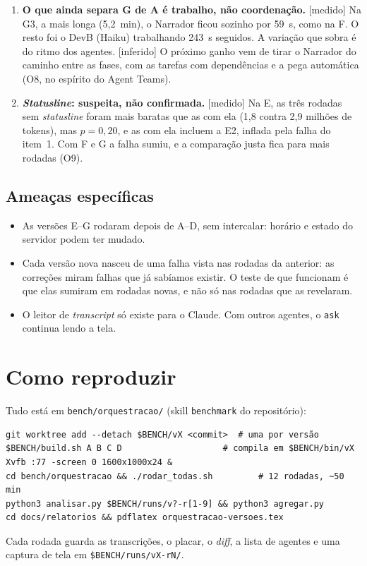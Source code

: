 \documentclass[11pt,a4paper]{article}
\newcommand{\rot}[1]{\textsf{\footnotesize[#1]}}
\begin{document}
\begin{enumerate}[leftmargin=*]
\item \textbf{O que ainda separa G de A é trabalho, não coordenação.} \rot{medido} Na G3, a mais longa (5,2~min), o
  Narrador ficou sozinho por 59~s, como na F. O resto foi o DevB (Haiku) trabalhando 243~s seguidos. A variação que
  sobra é do ritmo dos agentes. \rot{inferido} O próximo ganho vem de tirar o Narrador do caminho entre as fases, com
  as tarefas com dependências e a pega automática (O8, no espírito do Agent Teams).
\item \textbf{\emph{Statusline}: suspeita, não confirmada.} \rot{medido} Na E, as três rodadas sem \emph{statusline} foram
  mais baratas que as com ela (1,8 contra 2,9 milhões de tokens), mas $p=0{,}20$, e as com ela incluem a E2, inflada
  pela falha do item~1. Com F e G a falha sumiu, e a comparação justa fica para mais rodadas (O9).
\end{enumerate}

\subsection{Ameaças específicas}

\begin{itemize}
\item As versões E--G rodaram depois de A--D, sem intercalar: horário e estado do servidor podem ter mudado.
\item Cada versão nova nasceu de uma falha vista nas rodadas da anterior: as correções miram falhas que já sabíamos
  existir. O teste de que funcionam é que elas sumiram em rodadas novas, e não só nas rodadas que as revelaram.
\item O leitor de \emph{transcript} só existe para o Claude. Com outros agentes, o \texttt{ask} continua lendo a tela.
\end{itemize}

\section{Como reproduzir}

Tudo está em \texttt{bench/orquestracao/} (skill \texttt{benchmark} do repositório):
\begin{verbatim}
git worktree add --detach $BENCH/vX <commit>  # uma por versão
$BENCH/build.sh A B C D                    # compila em $BENCH/bin/vX
Xvfb :77 -screen 0 1600x1000x24 &
cd bench/orquestracao && ./rodar_todas.sh         # 12 rodadas, ~50 min
python3 analisar.py $BENCH/runs/v?-r[1-9] && python3 agregar.py
cd docs/relatorios && pdflatex orquestracao-versoes.tex
\end{verbatim}
Cada rodada guarda as transcrições, o placar, o \emph{diff}, a lista de agentes e uma captura de tela em
\texttt{\$BENCH/runs/vX-rN/}.
\end{document}
